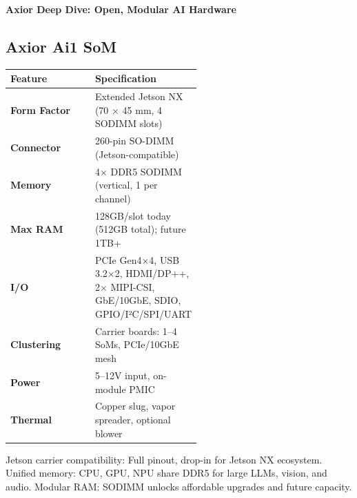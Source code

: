 \documentclass[12pt]{article}
\begin{document}
\begin{center}
    {\brochuretitle\Huge\bfseries\color{axiorMagenta} Axior Deep Dive: Open, Modular AI Hardware}
\end{center}
\vspace{1em}

\begin{multicols}{2}

\subsection{Axior Ai1 SoM}
\begin{center}
\begin{tabular}{@{} >{\bfseries}l p{0.55\linewidth} @{}} %
\toprule
\textbf{Feature}      & \textbf{Specification} \\
\midrule
Form Factor  & Extended Jetson NX (70 × 45 mm, 4 SODIMM slots) \\
Connector    & 260-pin SO-DIMM (Jetson-compatible) \\
Memory       & 4× DDR5 SODIMM (vertical, 1 per channel) \\
Max RAM      & 128GB/slot today (512GB total); future 1TB+ \\
I/O          & PCIe Gen4×4, USB 3.2×2, HDMI/DP++, 2× MIPI-CSI, GbE/10GbE, SDIO, GPIO/I²C/SPI/UART \\
Clustering   & Carrier boards: 1–4 SoMs, PCIe/10GbE mesh \\
Power        & 5–12V input, on-module PMIC \\
Thermal      & Copper slug, vapor spreader, optional blower \\
\bottomrule
\end{tabular}
\end{center}
\vspace{0.5em}
\small Jetson carrier compatibility: Full pinout, drop-in for Jetson NX ecosystem. Unified memory: CPU, GPU, NPU share DDR5 for large LLMs, vision, and audio. Modular RAM: SODIMM unlocks affordable upgrades and future capacity.

\vspace{1em} %


\end{multicols}
\end{document}
